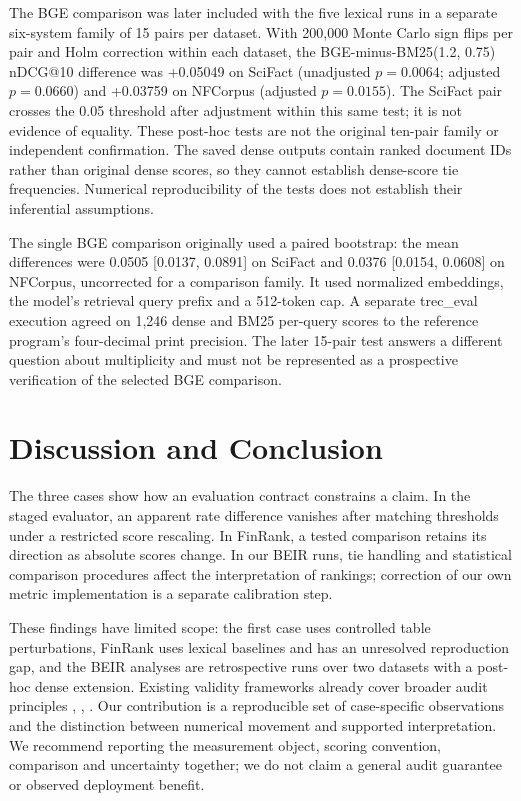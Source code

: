 \documentclass[conference]{IEEEtran}
\begin{document}
The BGE comparison was later included with the five lexical runs in a
separate six-system family of 15 pairs per dataset. With 200,000 Monte
Carlo sign flips per pair and Holm correction within each dataset, the
BGE-minus-BM25(1.2, 0.75) nDCG@10 difference was +0.05049 on SciFact
(unadjusted \(p = 0.0064\); adjusted \(p = 0.0660\)) and +0.03759 on
NFCorpus (adjusted \(p = 0.0155\)). The SciFact pair crosses the 0.05
threshold after adjustment within this same test; it is not evidence of
equality. These post-hoc tests are not the original ten-pair family or
independent confirmation. The saved dense outputs contain ranked
document IDs rather than original dense scores, so they cannot establish
dense-score tie frequencies. Numerical reproducibility of the tests does
not establish their inferential assumptions.

The single BGE comparison originally used a paired bootstrap: the mean
differences were 0.0505 {[}0.0137, 0.0891{]} on SciFact and 0.0376
{[}0.0154, 0.0608{]} on NFCorpus, uncorrected for a comparison family.
It used normalized embeddings, the model's retrieval query prefix and a
512-token cap. A separate trec\_eval execution agreed on 1,246 dense and
BM25 per-query scores to the reference program's four-decimal print
precision. The later 15-pair test answers a different question about
multiplicity and must not be represented as a prospective verification
of the selected BGE comparison.

\section{Discussion and Conclusion}\label{discussion-and-conclusion}

The three cases show how an evaluation contract constrains a claim. In
the staged evaluator, an apparent rate difference vanishes after
matching thresholds under a restricted score rescaling. In FinRank, a
tested comparison retains its direction as absolute scores change. In
our BEIR runs, tie handling and statistical comparison procedures affect
the interpretation of rankings; correction of our own metric
implementation is a separate calibration step.

These findings have limited scope: the first case uses controlled table
perturbations, FinRank uses lexical baselines and has an unresolved
reproduction gap, and the BEIR analyses are retrospective runs over two
datasets with a post-hoc dense extension. Existing validity frameworks
already cover broader audit principles \cite{r3}, \cite{r4}, \cite{r5}.
Our contribution is a reproducible set of case-specific observations and
the distinction between numerical movement and supported interpretation.
We recommend reporting the measurement object, scoring convention,
comparison and uncertainty together; we do not claim a general audit
guarantee or observed deployment benefit.
\end{document}
